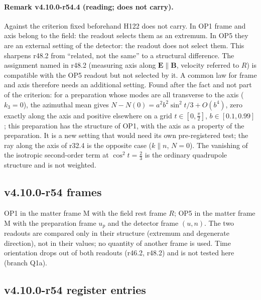 \paragraph{Remark v4.10.0-r54.4 (reading; does not carry).}
Against the criterion fixed beforehand H122 does not carry.  In OP1 frame and axis belong to the field: the readout selects them as an extremum.
In OP5 they are an external setting of the detector: the readout does not select them.  This sharpens r48.2 from ``related, not the same'' to a
structural difference.  The assignment named in r48.2 (measuring axis along \(\mathbf E\parallel\mathbf B\), velocity referred to \(R\)) is compatible with the OP5 readout
but not selected by it.  A common law for frame and axis therefore needs an additional setting.  Found after the fact and not part of the
criterion: for a preparation whose modes are all transverse to the axis (\(k_3=0\)), the azimuthal mean gives \(N-N(0)=a^2b^2\sin^2t/3+O(b^4)\), zero exactly along
the axis and positive elsewhere on a grid \(t\in[0,\tfrac\pi2]\), \(b\in[0.1,0.99]\); this preparation has the structure of OP1, with the axis as a property of the
preparation.  It is a new setting that would need its own pre-registered test; the ray along the axis of r32.4 is the opposite case (\(k\parallel n\), \(N=0\)).
The vanishing of the isotropic second-order term at \(\cos^2t=\tfrac23\) is the ordinary quadrupole structure and is not weighted.

\subsection*{v4.10.0-r54 frames}
\label{subsec:v4100-r54-frames}

OP1 in the matter frame M with the field rest frame \(R\); OP5 in the matter frame M with the preparation frame \(u_p\) and the detector frame \((u,n)\).  The two
readouts are compared only in their structure (extremum and degenerate direction), not in their values; no quantity of another frame is used.
Time orientation drops out of both readouts (r46.2, r48.2) and is not tested here (branch Q1a).

\subsection*{v4.10.0-r54 register entries}
\label{subsec:v4100-r54-register}

